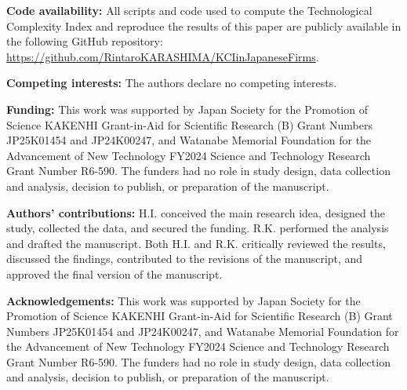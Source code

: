 \documentclass[lineno,pdflatex,sn-mathphys-num]{sn-jnl}%
\theoremstyle{thmstyleone}%
\theoremstyle{thmstyletwo}%
\theoremstyle{thmstylethree}%
\begin{document}
\textbf{Code availability:} All scripts and code used to compute the Technological Complexity Index and reproduce the results of this paper are publicly available in the following GitHub repository: \url{https://github.com/RintaroKARASHIMA/KCIinJapaneseFirms}.

\textbf{Competing interests:} The authors declare no competing interests.

\textbf{Funding:} This work was supported by Japan Society for the Promotion of Science KAKENHI Grant-in-Aid for Scientific Research (B) Grant Numbers JP25K01454 and JP24K00247, and Watanabe Memorial Foundation for the Advancement of New Technology FY2024 Science and Technology Research Grant Number R6-590. The funders had no role in study design, data collection and analysis, decision to publish, or preparation of the manuscript.

\textbf{Authors' contributions:} H.I. conceived the main research idea, designed the study, collected the data, and secured the funding. R.K. performed the analysis and drafted the manuscript. Both H.I. and R.K. critically reviewed the results, discussed the findings, contributed to the revisions of the manuscript, and approved the final version of the manuscript.

\textbf{Acknowledgements:} This work was supported by Japan Society for the Promotion of Science KAKENHI Grant-in-Aid for Scientific Research (B) Grant Numbers JP25K01454 and JP24K00247, and Watanabe Memorial Foundation for the Advancement of New Technology FY2024 Science and Technology Research Grant Number R6-590. The funders had no role in study design, data collection and analysis, decision to publish, or preparation of the manuscript.
\end{document}
